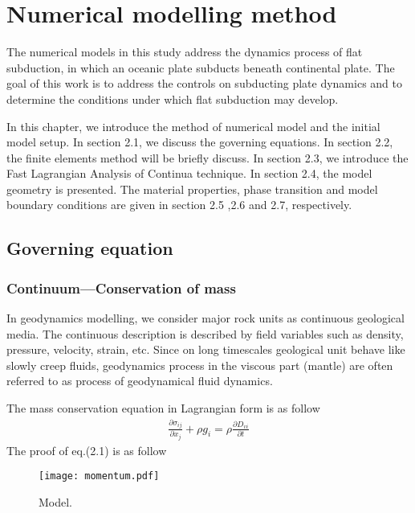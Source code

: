 
\chapter{Numerical modelling method}

The numerical models in this study address the dynamics process of flat subduction, in which an oceanic plate subducts beneath continental plate. The goal of this work is to address the controls on subducting plate dynamics and to determine the conditions under which flat subduction may develop. 

In this chapter, we introduce the method of numerical model and the initial model setup. In section 2.1, we discuss the governing equations. In section 2.2, the finite elements method will be briefly discuss. In section 2.3, we introduce the Fast Lagrangian Analysis of Continua technique. In section 2.4, the model geometry is presented. The material properties, phase transition and model boundary conditions are given in section 2.5 ,2.6 and 2.7, respectively.

\section{Governing equation}

\subsection{Continuum---Conservation of mass}

In geodynamics modelling, we consider major rock units as continuous geological media. The continuous description is described by field variables such as density, pressure, velocity, strain, etc. Since on long timescales geological unit behave like slowly creep fluids, geodynamics process in the viscous part (mantle) are often referred to as process of geodynamical fluid dynamics. 

The mass conservation equation in Lagrangian form is as follow
\begin{align}
\frac{\partial \sigma_{ij}}{\partial x_j}+\rho g_i = \rho \frac{\partial D_{vi}}{\partial t} 
\end{align}
The proof of eq.(2.1) is as follow
\begin{figure*}[ht!]
    \centering
    \texttt{[image: momentum.pdf]}
    \caption{ Model. }
    \label{fig::model}
\end{figure*}


